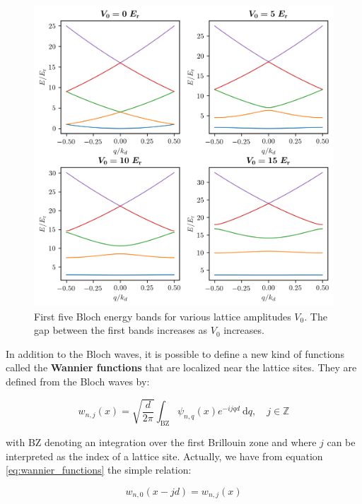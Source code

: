 \begin{figure}
    \centering
    \includegraphics[width=\textwidth]{Fig/Chapter2/bloch_bands.png}
    \caption[First five Bloch energy bands for various lattice amplitudes $V_0$]{First five Bloch energy bands for various lattice amplitudes $V_0$. The gap between the first bands increases as $V_0$ increases.}
    \label{fig:bloch_bands}
\end{figure}

In addition to the Bloch waves, it is possible to define a new kind of functions called the\textbf{ Wannier functions} \cite{wannier1937structure} that are localized near the lattice sites. They are defined from the Bloch waves by:

\begin{equation}
    w_{n, j}(x)=\sqrt{\frac{d}{2 \pi}} \int_{\mathrm{BZ}} \psi_{n, q}(x) e^{-i j q d} \mathrm{~d} q, \quad j \in \mathbb{Z}
    \label{eq:wannier_functions}
\end{equation}

\noindent with BZ denoting an integration over the first Brillouin zone and where $j$ can be interpreted as the index of a lattice site. Actually, we have from equation \ref{eq:wannier_functions} the simple relation:

\begin{equation}
    w_{n, 0}(x-j d)=w_{n, j}(x)
\end{equation}

